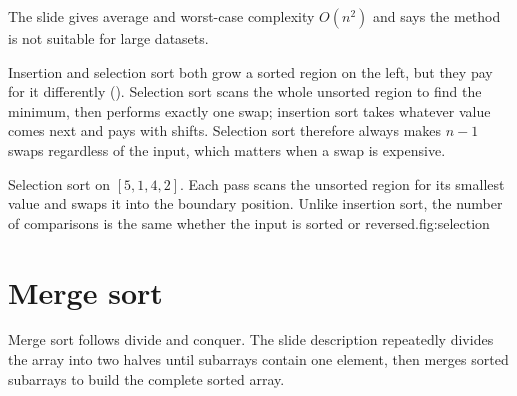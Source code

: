 The slide gives average and worst-case complexity $O(n^2)$ and says the method is not suitable for large datasets.

Insertion and selection sort both grow a sorted region on the left, but they pay for it
differently (). Selection sort scans the whole unsorted region to find
the minimum, then performs exactly one swap; insertion sort takes whatever value comes next
and pays with shifts. Selection sort therefore always makes $n-1$ swaps regardless of the
input, which matters when a swap is expensive.

\begin{utpfig}{Selection sort on $[5,1,4,2]$. Each pass scans the unsorted region for its
smallest value and swaps it into the boundary position. Unlike insertion sort, the number of
comparisons is the same whether the input is sorted or reversed.}{fig:selection}
\end{utpfig}

\section{Merge sort}

Merge sort follows divide and conquer. The slide description repeatedly divides the array into two halves until subarrays contain one element, then merges sorted subarrays to build the complete sorted array.

